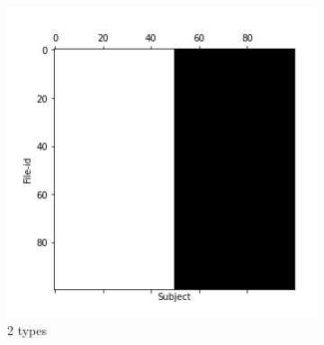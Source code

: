\documentclass[10pt, conference, compsocconf]{IEEEtran}
\begin{document}
\begin{figure}
\centering
        \begin{subfigure}[b]{0.45\columnwidth}
                  \includegraphics[width=\columnwidth]{data/Utility_Matrix/Synthetic/synthetic_subject_types/2_SubjectType_utility_matrix.png}
                  \caption{2 types}
        \end{subfigure}
        \begin{subfigure}[b]{0.45\columnwidth}

\end{subfigure}
\end{figure}
\end{document}
